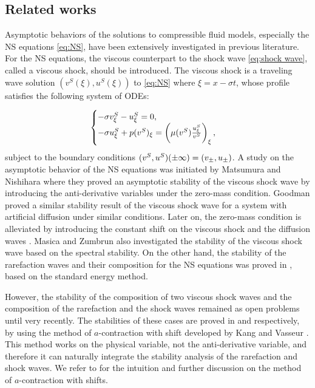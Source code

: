 \documentclass[11pt,reqno]{amsart}
\begin{document}
\subsection{Related works} 
Asymptotic behaviors of the solutions to compressible fluid models, especially the NS equations \eqref{eq:NS}, have been extensively investigated in previous literature. For the NS equations, the viscous counterpart to the shock wave \eqref{eq:shock wave}, called a viscous shock, should be introduced. The viscous shock is a traveling wave solution $(v^S(\xi),u^S(\xi))$ to \eqref{eq:NS} where $\xi=x-\sigma t$, whose profile satisfies the following system of ODEs:

\begin{equation*} %
\begin{cases}
-\sigma \vs_\xi-\us_\xi=0,\\
-\sigma \us_\xi+p(\vs)_\xi=\left(\mu(\vs)\frac{\us_\xi}{v^S}\right)_\xi,
\end{cases}
\end{equation*}
subject to the boundary conditions $(v^S,u^S)(\pm\infty)=(v_\pm,u_\pm)$. A study on the asymptotic behavior of the NS equations was initiated by Matsumura and Nishihara \cite{MN85} where they proved an asymptotic stability of the viscous shock wave by introducing the anti-derivative variables under the zero-mass condition. Goodman \cite{G86} proved a similar stability result of the viscous shock wave for a system with artificial diffusion under similar conditions. Later on, the zero-mass condition is alleviated by introducing the constant shift on the viscous shock \cite{L85} and the diffusion waves \cite{SX93}. Masica and Zumbrun \cite{MZ04} also investigated the stability of the viscous shock wave based on the spectral stability. On the other hand, the stability of the rarefaction waves and their composition for the NS equations was proved in \cite{MN86,MN92}, based on the standard energy method.

However, the stability of the composition of two viscous shock waves and the composition of the rarefaction and the shock waves remained as open problems until very recently. The stabilities of these cases are proved in \cite{HKK23} and \cite{KVW23} respectively, by using the method of $a$-contraction with shift developed by Kang and Vasseur \cite{KV16}. This method works on the physical variable, not the anti-derivative variable, and therefore it can naturally integrate the stability analysis of the rarefaction and shock waves. We refer to \cite{Kang-V-1,KV21,KV-Inven,KVW23} for the intuition and further discussion on the method of $a$-contraction with shifts.
\end{document}
